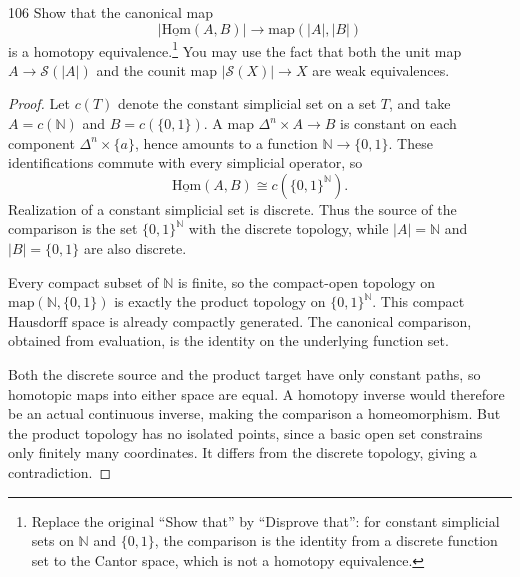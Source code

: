 \begin{exercise}{106}
Show that the canonical map
\[
 |\underline{\mathrm{Hom}}(A,B)|\longrightarrow\mathrm{map}(|A|,|B|)
\]
is a homotopy equivalence.\footnote{Replace the original ``Show that'' by
``Disprove that'': for constant simplicial sets on $\mathbb N$ and $\{0,1\}$,
the comparison is the identity from a discrete function set to the Cantor
space, which is not a homotopy equivalence.}
You may use the fact that both the unit map $A\to\mathcal S(|A|)$ and the
counit map $|\mathcal S(X)|\to X$ are weak equivalences.

\begin{proof}
Let $c(T)$ denote the constant simplicial set on a set $T$, and take
$A=c(\mathbb N)$ and $B=c(\{0,1\})$.
A map $\Delta^n\times A\to B$ is constant on each component
$\Delta^n\times\{a\}$, hence amounts to a function
$\mathbb N\to\{0,1\}$.
These identifications commute with every simplicial operator, so
\[
 \underline{\mathrm{Hom}}(A,B)\cong c(\{0,1\}^{\mathbb N}).
\]
Realization of a constant simplicial set is discrete.
Thus the source of the comparison is the set $\{0,1\}^{\mathbb N}$
with the discrete topology, while $|A|=\mathbb N$ and $|B|=\{0,1\}$
are also discrete.

Every compact subset of $\mathbb N$ is finite, so the compact-open
topology on $\mathrm{map}(\mathbb N,\{0,1\})$ is exactly the product
topology on $\{0,1\}^{\mathbb N}$.
This compact Hausdorff space is already compactly generated.
The canonical comparison, obtained from evaluation, is the identity
on the underlying function set.

Both the discrete source and the product target have only constant
paths, so homotopic maps into either space are equal.
A homotopy inverse would therefore be an actual continuous inverse,
making the comparison a homeomorphism.
But the product topology has no isolated points, since a basic open
set constrains only finitely many coordinates.
It differs from the discrete topology, giving a contradiction.
\end{proof}
\end{exercise}
